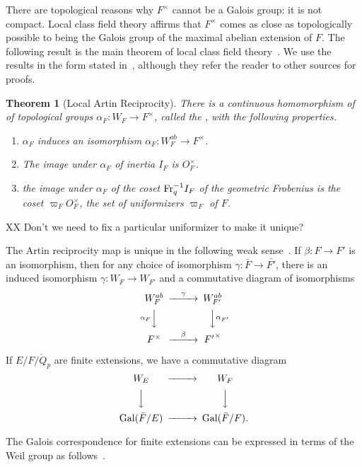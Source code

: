 \documentclass{amsart}
\newtheorem{theorem}[equation]{Theorem}
\def\oG{\op{Gal}}
\begin{document}
There are topological reasons why $F^\times$ cannot be a Galois group: it is not
compact.  Local class field theory affirms that $F^\times$ comes as close as topologically
possible to being the Galois group of the maximal abelian extension of $F$.
The following result is the main theorem of local class field theory~\cite{CFT}.
We use the results in the form stated in~\cite{bushnell-henniart}, although they
refer the reader to other sources for proofs.

\begin{theorem}[Local Artin Reciprocity]  There is a continuous homomorphism of
of topological groups $\alpha_F:W_F\to F^\times$, called the , with the following properties.
\begin{enumerate}
\item $\alpha_F$ induces an isomorphism $\alpha_F:W^{ab}_F \to F^\times$.
\item The image under $\alpha_F$ of inertia $I_F$  is $O_F^\times$.
\item the image under $\alpha_F$ of the coset ${\operatorname{Fr}}^{-1}_q I_F$ of
  the geometric Frobenius is the coset $\varpi_F O^\times_F$, the set of
  uniformizers $\varpi_F$ of $F$.
\end{enumerate}
\end{theorem}

XX Don't we need to fix a particular uniformizer to make it unique?

The Artin reciprocity map is unique in the following weak
sense~\cite[29.1]{bushnell-henniart}.  If $\beta:F\to F'$ is an
isomorphism, then for any choice of isomorphism $\gamma:\bar{F}\to
\bar{F'}$, there is an induced isomorphism $\gamma:W_F\to W_{F'}$ and
a commutative diagram of isomorphisms
\[
\begin{CD}
W_F^{ab} @>\gamma>> W_{F'}^{ab}\\
@V\alpha_FVV @VV\alpha_{F'}V\\
F^\times @>\beta >> {F'}^\times
\end{CD}
\]

If $E/F/\ring{Q}_p$ are finite extensions, we have a commutative
diagram
\[
\begin{CD}
W_E @>>> W_F\\
@VVV @VVV\\
\oG(\bar{F}/E) @>>> \oG(\bar{F}/F).
\end{CD}
\]

The Galois correspondence for finite extensions can be expressed in terms of
the Weil group as follows~\cite[Prop. 28.5]{bushnell-henniart}.
\end{document}
